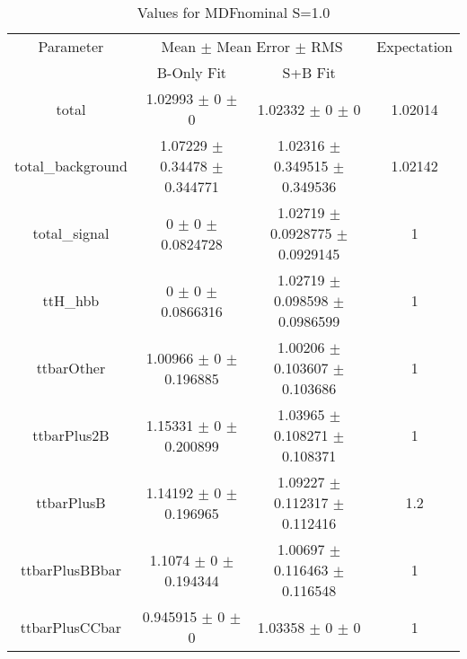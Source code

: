 \begin{table}
\centering
\caption{Values for MDFnominal S=1.0}
\begin{tabular}{cccc}
\toprule
Parameter & \multicolumn{2}{c}{Mean $\pm$ Mean Error $\pm$ RMS} & Expectation\\
 & B-Only Fit & S+B Fit & \\
\midrule
total & \num{1.02993} $\pm$ \num{0} $\pm$ \num{0} & \num{1.02332} $\pm$ \num{0} $\pm$ \num{0} & \num{1.02014}\\
total\_background & \num{1.07229} $\pm$ \num{0.34478} $\pm$ \num{0.344771} & \num{1.02316} $\pm$ \num{0.349515} $\pm$ \num{0.349536} & \num{1.02142}\\
total\_signal & \num{0} $\pm$ \num{0} $\pm$ \num{0.0824728} & \num{1.02719} $\pm$ \num{0.0928775} $\pm$ \num{0.0929145} & \num{1}\\
ttH\_hbb & \num{0} $\pm$ \num{0} $\pm$ \num{0.0866316} & \num{1.02719} $\pm$ \num{0.098598} $\pm$ \num{0.0986599} & \num{1}\\
ttbarOther & \num{1.00966} $\pm$ \num{0} $\pm$ \num{0.196885} & \num{1.00206} $\pm$ \num{0.103607} $\pm$ \num{0.103686} & \num{1}\\
ttbarPlus2B & \num{1.15331} $\pm$ \num{0} $\pm$ \num{0.200899} & \num{1.03965} $\pm$ \num{0.108271} $\pm$ \num{0.108371} & \num{1}\\
ttbarPlusB & \num{1.14192} $\pm$ \num{0} $\pm$ \num{0.196965} & \num{1.09227} $\pm$ \num{0.112317} $\pm$ \num{0.112416} & \num{1.2}\\
ttbarPlusBBbar & \num{1.1074} $\pm$ \num{0} $\pm$ \num{0.194344} & \num{1.00697} $\pm$ \num{0.116463} $\pm$ \num{0.116548} & \num{1}\\
ttbarPlusCCbar & \num{0.945915} $\pm$ \num{0} $\pm$ \num{0} & \num{1.03358} $\pm$ \num{0} $\pm$ \num{0} & \num{1}\\
\bottomrule
\end{tabular}
\end{table}
